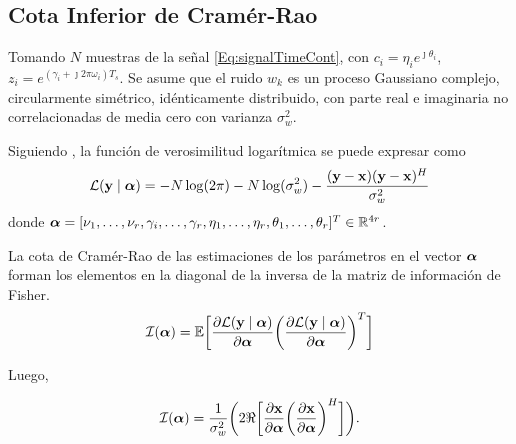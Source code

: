         \subsection{Cota Inferior de Cramér-Rao}\label{App:CRB}
		
			Tomando $N$ muestras de la señal \eqref{Eq:signalTimeCont}, con $c_i = \eta_ie^{\jmath\theta_i}$, $z_i = e^{(\gamma_i+\jmath2\pi\omega_i)T_s}$. Se asume que el ruido $w_k$ es un proceso Gaussiano complejo, circularmente simétrico, idénticamente distribuido, con parte real e imaginaria no correlacionadas de media cero con varianza $\sigma_w^2$.
			
			Siguiendo \cite{Yao1995}, la función de verosimilitud logarítmica se puede expresar como
			\begin{equation}
				\mathcal{L}(\mathbf{y}\mid \boldsymbol{\alpha}) = -N\log(2\pi) - N\log(\sigma_w^2) - \frac{(\mathbf{y} - \mathbf{x})(\mathbf{y}-\mathbf{x})^H}{\sigma_w^2}
				\label{Eq:LogLikelihood}
			\end{equation}
			donde $\boldsymbol{\alpha} = [\nu_1,\ldots,\nu_r,\gamma_i,\ldots,\gamma_r,\eta_1,\ldots,\eta_r,\theta_1,\ldots,\theta_r]^T\in\mathbb{R}^{4r}$. 
			
			La cota de Cramér-Rao de las estimaciones de los parámetros en el vector $\boldsymbol{\alpha}$ forman los elementos en la diagonal de la inversa de la matriz de información de Fisher.
			\begin{equation}
				\mathcal{I}(\boldsymbol{\alpha}) = \mathbb{E}\bigg[\frac{\partial\mathcal{L}(\mathbf{y}\mid\boldsymbol{\alpha})}{\partial\boldsymbol{\alpha}}\bigg(\frac{\partial\mathcal{L}(\mathbf{y}\mid\boldsymbol{\alpha})}{\partial\boldsymbol{\alpha}}\bigg)^T\bigg]
				\label{Eq:FisherInformationMatrix}
			\end{equation}
			
			Luego,
			
			\begin{equation}
				\mathcal{I}(\boldsymbol{\alpha}) =\frac{1}{ \sigma_w^2}\bigg(2\Re\bigg[\frac{\partial\mathbf{x}}{\partial\boldsymbol{\alpha}}\bigg(\frac{\partial\mathbf{x}}{\partial\boldsymbol{\alpha}}\bigg)^H\bigg]\bigg).
				\label{Eq:FisherInformationMatrix1}
			\end{equation}
			
